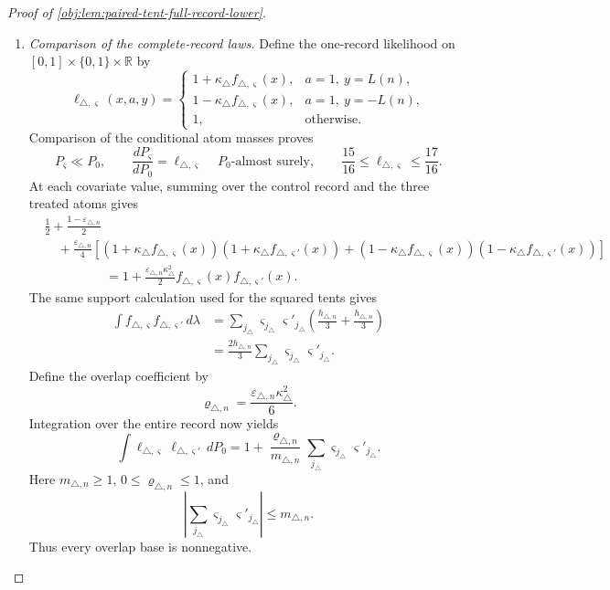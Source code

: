\begin{proof}[Proof of \cref{obj:lem:paired-tent-full-record-lower}]
\begin{enumerate}
\item \emph{Comparison of the complete-record laws.}
Define the one-record likelihood on
\([0,1]\times\{0,1\}\times\mathbb R\) by
\[
\ell_{\triangle,\varsigma}(x,a,y)=
\begin{cases}
1+\kappa_\triangle f_{\triangle,\varsigma}(x),
&a=1,\ y=L(n),\\
1-\kappa_\triangle f_{\triangle,\varsigma}(x),
&a=1,\ y=-L(n),\\
1,&\text{otherwise}.
\end{cases}
\]
Comparison of the conditional atom masses proves
\[
P_\varsigma\ll P_0,
\qquad
\frac{dP_\varsigma}{dP_0}=\ell_{\triangle,\varsigma}
\quad P_0\text{-almost surely},
\qquad
\frac{15}{16}\le\ell_{\triangle,\varsigma}\le\frac{17}{16}.
\]
At each covariate value, summing over the control record and the three
treated atoms gives
\[
\begin{aligned}
&\frac12+\frac{1-\varepsilon_{\triangle,n}}2\\
&\quad+\frac{\varepsilon_{\triangle,n}}4
\left[
(1+\kappa_\triangle f_{\triangle,\varsigma}(x))
(1+\kappa_\triangle f_{\triangle,\varsigma'}(x))
+
(1-\kappa_\triangle f_{\triangle,\varsigma}(x))
(1-\kappa_\triangle f_{\triangle,\varsigma'}(x))
\right]\\
&\hspace{2cm}
=1+\frac{\varepsilon_{\triangle,n}\kappa_\triangle^2}{2}
f_{\triangle,\varsigma}(x)f_{\triangle,\varsigma'}(x).
\end{aligned}
\]
The same support calculation used for the squared tents gives
\[
\begin{aligned}
\int f_{\triangle,\varsigma}f_{\triangle,\varsigma'}\,d\lambda
&=
\sum_{j_\triangle}
\varsigma_{j_\triangle}\varsigma'_{j_\triangle}
\left(\frac{h_{\triangle,n}}3+\frac{h_{\triangle,n}}3\right)\\
&=\frac{2h_{\triangle,n}}3
\sum_{j_\triangle}\varsigma_{j_\triangle}\varsigma'_{j_\triangle}.
\end{aligned}
\]
Define the overlap coefficient by
\[
\varrho_{\triangle,n}
=\frac{\varepsilon_{\triangle,n}\kappa_\triangle^2}{6}.
\]
Integration over the entire record now yields
\[
\int\ell_{\triangle,\varsigma}\ell_{\triangle,\varsigma'}\,dP_0
=
1+\frac{\varrho_{\triangle,n}}{m_{\triangle,n}}
\sum_{j_\triangle}\varsigma_{j_\triangle}\varsigma'_{j_\triangle}.
\]
Here \(m_{\triangle,n}\ge1\), \(0\le\varrho_{\triangle,n}\le1\), and
\[
\left|
\sum_{j_\triangle}\varsigma_{j_\triangle}\varsigma'_{j_\triangle}
\right|\le m_{\triangle,n}.
\]
Thus every overlap base is nonnegative.


\end{enumerate}
\end{proof}
